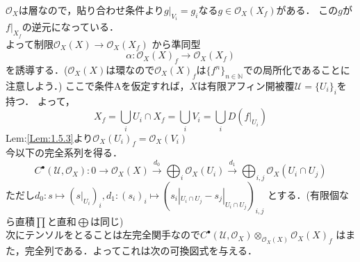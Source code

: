 {$\mathcal{O}_{X}$は層なので，貼り合わせ条件より$g|_{V_{i}} = g_{i}$なる$g\in \mathcal{O}_{X}(X_{f})$がある．
この$g$が$f|_{X_{f}}$の逆元になっている．\\
よって制限$\mathcal{O}_{X}(X)\to \mathcal{O}_{X}(X_{f})$
から準同型
\begin{equation*}
\alpha : \mathcal{O}_{X}(X)_{f}\to \mathcal{O}_{X}(X_{f})
\end{equation*}
を誘導する．($\mathcal{O}_{X}(X)$は環なので$\mathcal{O}_{X}(X)_{f}$は$\{f^{n}\}_{n\in \mathbb{N}}$での局所化であることに注意しよう．)
ここで条件Aを仮定すれば，$X$は有限アフィン開被覆$\mathcal{U} = \{U_{i}\}_{i}$を持つ．
よって，
\begin{equation*}
X_{f} = \bigcup_{i}U_{i}\cap X_{f} = \bigcup_{i}V_{i} = \bigcup_{i}D(f|_{U_{i}})
\end{equation*}
Lem:\ref{Lem:1.5.3}より$\mathcal{O}_{X}(U_{i})_{f} = \mathcal{O}_{X}(V_{i})$\\
今以下の完全系列を得る．
\begin{equation*}
C^{\bullet}(\mathcal{U},\mathcal{O}_{X}):0 \longrightarrow \mathcal{O}_{X}(X) \stackrel{d_{0}}{\longrightarrow} \bigoplus_{i}\mathcal{O}_{X}(U_{i}) \stackrel{d_{1}}{\longrightarrow} \bigoplus_{i,j}\mathcal{O}_{X}(U_{i} \cap U_{j})
\end{equation*}
ただし$d_{0}:s\mapsto (s|_{U_{i}})_{i},d_{1}:(s_{i})_{i}\mapsto (s_{i}|_{U_{i}\cap U_{j}} - s_{j}|_{U_{i} \cap U_{j}})_{i,j}$
とする．(有限個なら直積$\prod$と直和$\bigoplus$は同じ)\\
次にテンソルをとることは左完全関手なので$C^{\bullet}(\mathcal{U},\mathcal{O}_{X})\otimes_{\mathcal{O}_{X}(X)}\mathcal{O}_{X}(X)_{f}$
はまた，完全列である．よってこれは次の可換図式を与える．

\begin{center}
\end{center}
}